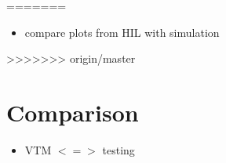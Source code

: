 \documentclass[ExampleMasters.tex]{subfiles}
\begin{document}
=======
\begin{itemize}
	\item compare plots from \gls{HIL}  with simulation
\end{itemize}
>>>>>>> origin/master

\section{Comparison}
\label{sec:results_comparrison}
\begin{itemize}
	\item \gls{VTM}  $<=>$ testing
\end{itemize}
\end{document}
